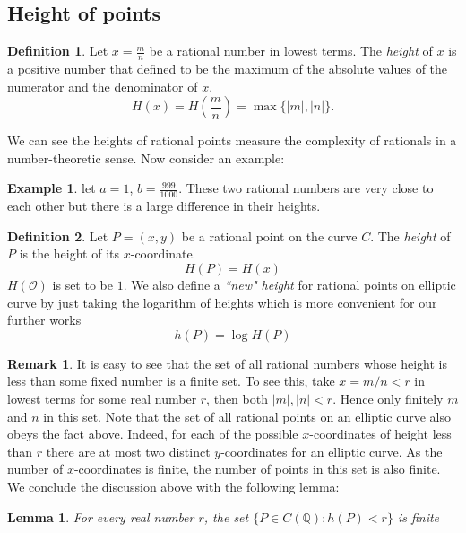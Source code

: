 \documentclass[12pt]{article}
\newtheorem{lemma}{Lemma}[subsection]
\theoremstyle{remark}
\theoremstyle{definition}
\newtheorem{remark}{Remark}[subsection]
\newtheorem{example}{Example}[subsection]
\newtheorem{definition}{Definition}[subsection]
\begin{document}
    \subsection{Height of points}
         \begin{definition}
             Let $x=\frac{m}{n}$ be a rational number in lowest terms. The \textit{height} of $x$ is a positive number that defined to be the maximum of the absolute values of the numerator and the denominator of $x$.
             $$H(x)=H\left(\frac{m}{n}\right)=\max \{\lvert m \rvert,\lvert n \rvert\}.$$
         \end{definition}
         We can see the heights of rational points measure the complexity of rationals in a number-theoretic sense. Now consider an example:
         \begin{example}
            let $a = 1$, $b=\frac{999}{1000}$. These two rational numbers are very close to each other but there is a large difference in their heights.
         \end{example}
         \begin{definition}
             Let $P=(x,y)$ be a rational point on the curve $C$. The \textit{height} of $P$ is the height of its $x$-coordinate.
             $$H(P)=H(x)$$
             $H(\mathcal{O})$ is set to be $1$. We also define a \textit{``new" height} for rational points on elliptic curve by just taking the logarithm of heights which is more convenient for our further works
             $$h(P)=\log H(P)$$
         \end{definition}
         \begin{remark}
             It is easy to see that the set of all rational numbers whose height is less than some fixed number is a finite set. To see this, take $x=m/n < r$ in lowest terms for some real number $r$, then both $\lvert m \rvert,\lvert n \rvert < r$. Hence only finitely $m$ and $n$ in this set. Note that the set of all rational points on an elliptic curve also obeys the fact above. Indeed, for each of the possible $x$-coordinates of height less than $r$ there are at most two distinct $y$-coordinates for an elliptic curve. As the number of $x$-coordinates is finite, the number of points in this set is also finite. We conclude the discussion above with the following lemma:
         \end{remark}
         \begin{lemma}\label{lemma-bounded-height-fin}
             For every real number $r$, the set $\{ P\in C(\mathbb Q): h(P)<r \}$ is finite
         \end{lemma}
\end{document}

